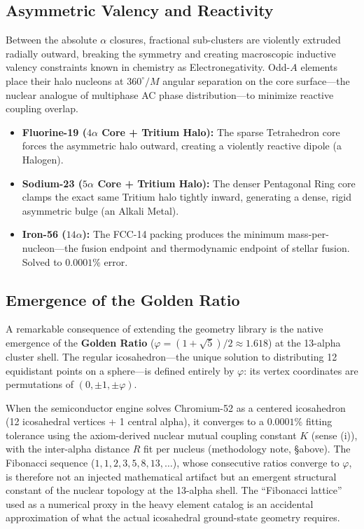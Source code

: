 \subsection{Asymmetric Valency and Reactivity}
Between the absolute $\alpha$ closures, fractional sub-clusters are violently extruded radially outward, breaking the symmetry and creating macroscopic inductive valency constraints known in chemistry as Electronegativity. Odd-$A$ elements place their halo nucleons at $360^\circ/M$ angular separation on the core surface---the nuclear analogue of multiphase AC phase distribution---to minimize reactive coupling overlap.
\begin{itemize}
    \item \textbf{Fluorine-19 ($4\alpha$ Core + Tritium Halo):} The sparse Tetrahedron core forces the asymmetric halo outward, creating a violently reactive dipole (a Halogen).
    \item \textbf{Sodium-23 ($5\alpha$ Core + Tritium Halo):} The denser Pentagonal Ring core clamps the exact same Tritium halo tightly inward, generating a dense, rigid asymmetric bulge (an Alkali Metal).
    \item \textbf{Iron-56 ($14\alpha$):} The FCC-14 packing produces the minimum mass-per-nucleon---the fusion endpoint and thermodynamic endpoint of stellar fusion. Solved to $0.0001\%$ error.
\end{itemize}

\subsection{Emergence of the Golden Ratio}
A remarkable consequence of extending the geometry library is the native emergence of the \textbf{Golden Ratio} ($\varphi = (1+\sqrt{5})/2 \approx 1.618$) at the 13-alpha cluster shell. The regular icosahedron---the unique solution to distributing 12 equidistant points on a sphere---is defined entirely by $\varphi$: its vertex coordinates are permutations of $(0, \pm 1, \pm \varphi)$.

When the semiconductor engine solves Chromium-52 as a centered icosahedron (12 icosahedral vertices + 1 central alpha), it converges to a $0.0001\%$ fitting tolerance using the axiom-derived nuclear mutual coupling constant $K$ (sense (i)), with the inter-alpha distance $R$ fit per nucleus (methodology note, \S above). The Fibonacci sequence ($1, 1, 2, 3, 5, 8, 13, \ldots$), whose consecutive ratios converge to $\varphi$, is therefore not an injected mathematical artifact but an emergent structural constant of the nuclear topology at the 13-alpha shell. The ``Fibonacci lattice'' used as a numerical proxy in the heavy element catalog is an accidental approximation of what the actual icosahedral ground-state geometry requires.

